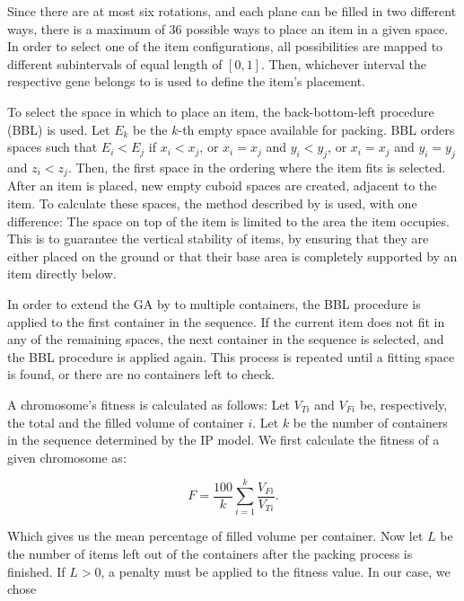 

Since there are at most six rotations, and each plane can be filled in two different ways, there is a maximum of 36 possible ways to place an item in a given space. In order to select one of the item configurations, all possibilities are mapped to different subintervals of equal length of $[0,1]$. Then, whichever interval the respective gene belongs to is used to define the item's placement.

To select the space in which to place an item, the back-bottom-left procedure (BBL) is used. Let $E_k$ be the $k$-th empty space available for packing. BBL orders spaces such that $E_i < E_j$ if $x_i < x_j$, or $x_i = x_j$ and $y_i < y_j$, or $x_i = x_j$ and $y_i = y_j$ and $z_i < z_j$. Then, the first space in the ordering where the item fits is selected. After an item is placed, new empty cuboid spaces are created, adjacent to the item. To calculate these spaces, the method described by \textcite{LAI1997} is used, with one difference: The space on top of the item is limited to the area the item occupies. This is to guarantee the vertical stability of items, by ensuring that they are either placed on the ground or that their base area is completely supported by an item directly below.

In order to extend the GA by \textcite{GONÇALVES2011} to multiple containers, the BBL procedure is applied to the first container in the sequence. If the current item does not fit in any of the remaining spaces, the next container in the sequence is selected, and the BBL procedure is applied again. This process is repeated until a fitting space is found, or there are no containers left to check.

A chromosome's fitness is calculated as follows: Let $V_{Ti}$ and $V_{Fi}$ be, respectively, the total and the filled volume of container $i$. Let $k$ be the number of containers in the sequence determined by the IP model. We first calculate the fitness of a given chromosome as:

\begin{equation}
    F = \frac{100}{k}\sum_{i=1}^{k}\frac{V_{Fi}}{V_{Ti}}.
\end{equation}

Which gives us the mean percentage of filled volume per container. Now let $L$ be the number of items left out of the containers after the packing process is finished. If $L > 0$, a penalty must be applied to the fitness value. In our case, we chose

